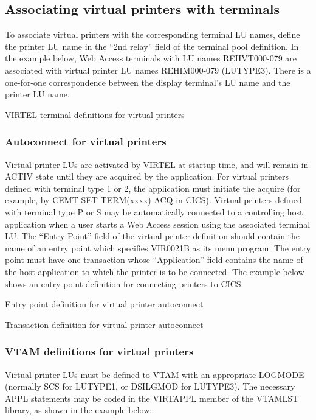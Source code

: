 \documentclass[letterpaper,10pt,english]{sphinxmanual}
\begin{document}
 


\subsection{Associating virtual printers with terminals}
\label{\detokenize{User_Guide:associating-virtual-printers-with-terminals}}
To associate virtual printers with the corresponding terminal LU names, define the printer LU name in the “2nd relay”
field of the terminal pool definition. In the example below, Web Access terminals with LU names REHVT000-079 are
associated with virtual printer LU names REHIM000-079 (LUTYPE3). There is a one-for-one correspondence between
the display terminal’s LU name and the printer LU name.

VIRTEL terminal definitions for virtual printers


\subsubsection{Autoconnect for virtual printers}
\label{\detokenize{User_Guide:autoconnect-for-virtual-printers}}
Virtual printer LUs are activated by VIRTEL at startup time, and will remain in ACTIV state until they are acquired by the
application. For virtual printers defined with terminal type 1 or 2, the application must initiate the acquire (for
example, by CEMT SET TERM(xxxx) ACQ in CICS).
Virtual printers defined with terminal type P or S may be automatically connected to a controlling host application
when a user starts a Web Access session using the associated terminal LU. The “Entry Point” field of the virtual printer
definition should contain the name of an entry point which specifies VIR0021B as its menu program. The entry point
must have one transaction whose “Application” field contains the name of the host application to which the printer is
to be connected.
The example below shows an entry point definition for connecting printers to CICS:

Entry point definition for virtual printer autoconnect

Transaction definition for virtual printer autoconnect


\subsubsection{VTAM definitions for virtual printers}
\label{\detokenize{User_Guide:vtam-definitions-for-virtual-printers}}
Virtual printer LUs must be defined to VTAM with an appropriate LOGMODE (normally SCS for LUTYPE1, or DSILGMOD
for LUTYPE3). The necessary APPL statements may be coded in the VIRTAPPL member of the VTAMLST library, as
shown in the example below:
\end{document}
